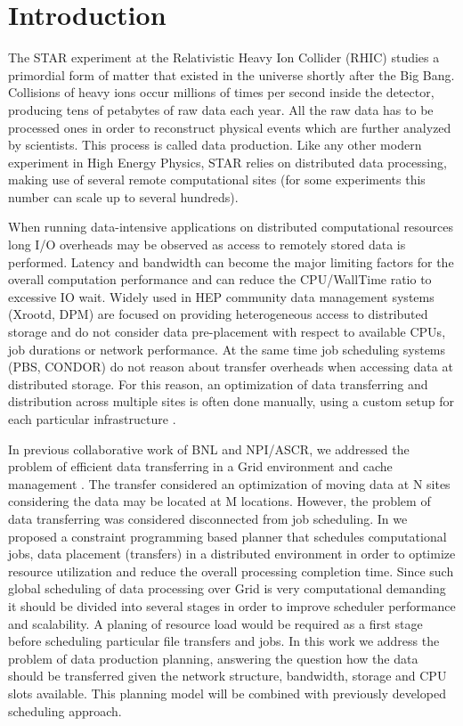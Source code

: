 \section{Introduction}
\label{intro}
The STAR experiment at the Relativistic Heavy Ion Collider (RHIC) studies a primordial form of matter that existed in the universe shortly after the Big Bang. Collisions of heavy ions occur millions of times per second inside the detector, producing tens of petabytes of raw data each year. All the raw data has to be processed ones in order to reconstruct physical events which are further analyzed by scientists. This process is called data production.
Like any other modern experiment in High Energy Physics, STAR relies on distributed data processing, making use of several remote computational sites (for some experiments this number can scale up to several hundreds).

When running data-intensive applications on distributed computational resources long I/O overheads may be observed as access to remotely stored data is performed. Latency and bandwidth can become the major limiting factors for the overall computation performance and can reduce the CPU/WallTime ratio to excessive IO wait. Widely used in HEP community data management systems (Xrootd, DPM) are focused on providing heterogeneous access to distributed storage and do not consider data pre-placement with respect to available CPUs, job durations or network performance. At the same time job scheduling systems (PBS, CONDOR) do not reason about transfer overheads when accessing data at distributed storage. For this reason, an optimization of data transferring and distribution across multiple sites is often done manually, using a custom setup for each particular infrastructure \cite{Balewski_2012pa}. 

In previous collaborative work of BNL and NPI/ASCR, we addressed the problem of efficient data transferring in a Grid environment \cite{Zerola} and cache management \cite{Makatun_cache}. The transfer considered an optimization of moving data at N sites considering the data may be located at M locations. However, the problem of data transferring was considered disconnected from job scheduling. In \cite{ACAT_2014} we proposed a constraint programming based planner that schedules computational jobs, data placement (transfers) in a distributed environment in order to optimize resource utilization and reduce the overall processing completion time. Since such global scheduling of data processing over Grid is very computational demanding it should be divided into several stages in order to improve scheduler performance and scalability. A planing of resource load would be required as a first stage before scheduling particular file transfers and jobs. In this work we address the problem of data production planning, answering the question how the data should be transferred given the network structure, bandwidth, storage and CPU slots available. This planning model will be combined with previously developed scheduling approach.

